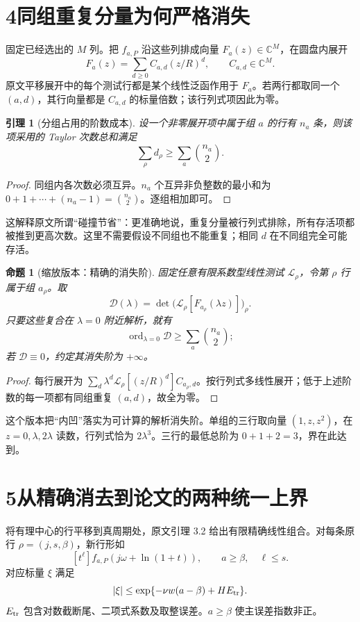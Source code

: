 \documentclass[11pt,a4paper]{article}
\newtheorem{proposition}{命题}
\newtheorem{lemma}{引理}
\newcommand{\ord}{\operatorname{ord}}
\begin{document}
\newpage
\section*{4\quad 同组重复分量为何严格消失}
固定已经选出的 $M$ 列。把 $f_{a,P}$ 沿这些列排成向量 $F_a(z)\in\mathbb C^M$，在圆盘内展开
\[
 F_a(z)=\sum_{d\ge0}C_{a,d}(z/R)^d,\qquad C_{a,d}\in\mathbb C^M.
\]
原文平移展开中的每个测试行都是某个线性泛函作用于 $F_a$。若两行都取同一个 $(a,d)$，其行向量都是 $C_{a,d}$ 的标量倍数；该行列式项因此为零。

\begin{lemma}[分组占用的阶数成本]
设一个非零展开项中属于组 $a$ 的行有 $n_a$ 条，则该项采用的 Taylor 次数总和满足
\[
 \sum_{\rho}d_\rho\ge \sum_a\binom{n_a}{2}.
\]
\end{lemma}
\begin{proof}
同组内各次数必须互异。$n_a$ 个互异非负整数的最小和为
$0+1+\cdots+(n_a-1)=\binom{n_a}{2}$。逐组相加即可。
\end{proof}
这解释原文所谓“碰撞节省”：更准确地说，重复分量被行列式排除，所有存活项都被推到更高次数。这里不需要假设不同组也不能重复；相同 $d$ 在不同组完全可能存活。

\begin{proposition}[缩放版本：精确的消失阶]
固定任意有限系数型线性测试 $\mathcal L_\rho$，令第 $\rho$ 行属于组 $a_\rho$。取
\[
 \mathcal D(\lambda)=\det\bigl(\mathcal L_\rho[F_{a_\rho}(\lambda z)]\bigr)_\rho.
\]
只要这些复合在 $\lambda=0$ 附近解析，就有
\[
 \ord_{\lambda=0}\mathcal D\ge\sum_a\binom{n_a}{2};
\]
若 $\mathcal D\equiv0$，约定其消失阶为 $+\infty$。
\end{proposition}
\begin{proof}
每行展开为 $\sum_d\lambda^d\mathcal L_\rho[(z/R)^d]C_{a_\rho,d}$。按行列式多线性展开；低于上述阶数的每一项都有同组重复 $(a,d)$，故全为零。
\end{proof}
这个版本把“内凹”落实为可计算的解析消失阶。单组的三行取向量 $(1,z,z^2)$，在 $z=0,\lambda,2\lambda$ 读数，行列式恰为 $2\lambda^3$。三行的最低总阶为 $0+1+2=3$，界在此达到。

\newpage
\section*{5\quad 从精确消去到论文的两种统一上界}
将有理中心的行平移到真周期处，原文引理 3.2 给出有限精确线性组合。对每条原行 $\rho=(j,s,\beta)$，新行形如
\[
 [t^\ell]f_{a,P}(j\omega+\ln(1+t)),\qquad a\ge\beta,\quad\ell\le s.
\]
对应标量 $\xi$ 满足
\[
 |\xi|\le \exp\{-\nu w(a-\beta)+HE_{\rm tr}\}.
\]
$E_{\rm tr}$ 包含对数截断尾、二项式系数及取整误差。$a\ge\beta$ 使主误差指数非正。
\end{document}
